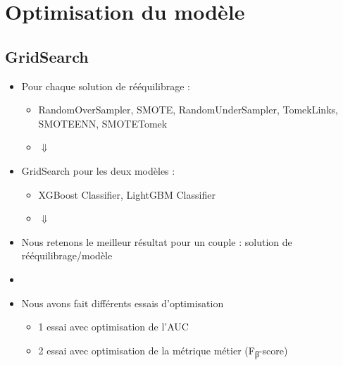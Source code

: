 \documentclass[8pt,aspectratio=169,hyperref={unicode=true}]{beamer}
\begin{document}
\section{Optimisation du modèle}
\subsection{GridSearch}
\begin{frame}{\insertsection}{\insertsubsection}
    \begin{itemize}
        \item[] Pour chaque solution de rééquilibrage :
            \begin{itemize}
                \item[] RandomOverSampler, SMOTE, RandomUnderSampler, TomekLinks, SMOTEENN, SMOTETomek
                \item[] \LARGE $\Downarrow$
            \end{itemize}
        \item[] GridSearch pour les deux modèles :
            \begin{itemize}
                \item[] XGBoost Classifier, LightGBM Classifier
                \item[] \LARGE $\Downarrow$
            \end{itemize}
        \item[] Nous retenons le meilleur résultat pour un couple : solution de rééquilibrage/modèle
        \item[]
        \item[] Nous avons fait différents essais d'optimisation
            \begin{itemize}
                \item 1\ier{} essai avec optimisation de l'AUC
                \item 2\nd{} essai avec optimisation de la métrique métier (F\textsubscript{β}-score)
            \end{itemize}
    \end{itemize}
\end{frame}
\end{document}
